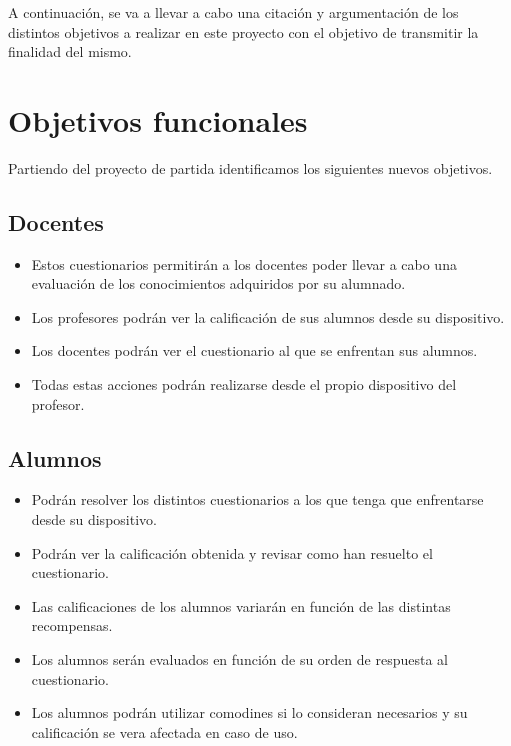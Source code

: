 
A continuación, se va a llevar a cabo una citación y argumentación de los distintos objetivos a realizar en este proyecto con el objetivo de transmitir la finalidad del mismo.

\section{Objetivos funcionales}

Partiendo del proyecto de partida identificamos los siguientes nuevos objetivos.

\subsection{Docentes}

\begin{itemize}

	\item Estos cuestionarios permitirán a los docentes poder llevar a cabo una evaluación de los conocimientos adquiridos por su alumnado.
	
	\item Los profesores podrán ver la calificación de sus alumnos desde su dispositivo.
	
	\item Los docentes podrán ver el cuestionario al que se enfrentan sus alumnos.
	
	\item Todas estas acciones podrán realizarse desde el propio dispositivo del profesor.	
	
	
\end{itemize}

\subsection{Alumnos}

\begin{itemize}

	\item Podrán resolver los distintos cuestionarios a los que tenga que enfrentarse desde su dispositivo.
	
	\item Podrán ver la calificación obtenida y revisar como han resuelto el cuestionario.
	
	\item Las calificaciones de los alumnos variarán en función de las distintas recompensas.
	
	\item Los alumnos serán evaluados en función de su orden de respuesta al cuestionario.
	
	\item Los alumnos podrán utilizar comodines si lo consideran necesarios y su calificación se vera afectada en caso de uso.
	

\end{itemize}

